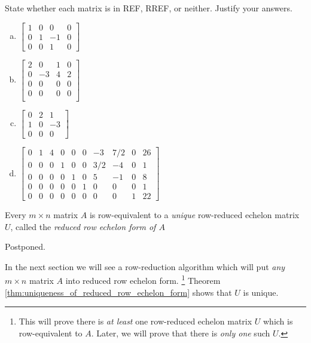 \documentclass[12pt,letterpaper,reqno]{article}
\numberwithin{equation}{section}
\newcommand{\ti}[1]{\textit{#1}}
\newcommand{\fixme}[1]{{\color{orange}{[#1]}}}
\begin{document}
\begin{exercise}
	State whether each matrix is in REF, RREF, or neither. Justify your answers.
	\begin{enumerate}[(a)]
	\item $\begin{bmatrix}
		1&0&0&0 \\
		0&1&-1&0 \\
		0&0&1&0
	\end{bmatrix}$
	\item $\begin{bmatrix}
		2 &0&1&0 \\
		0&-3&4&2 \\
		0&0&0&0 \\
		0&0&0&0 \\
	\end{bmatrix}$
	\item $\begin{bmatrix}
		0&2&1 \\
		1&0&-3 \\
		0&0&0 
	\end{bmatrix}$
	\item $\begin{bmatrix}
		0&1&4&0&0&0&-3&7/2 & 0 & 26 \\
		0&0&0&1&0&0&3/2&-4 & 0 & 1 \\
		0&0&0&0&1&0&5&-1&0&8 \\
		0&0&0&0&0&1&0&0&0&1 \\
		0&0&0&0&0&0&0&0 & 1 & 22
	\end{bmatrix}$
\end{enumerate}
\end{exercise}

\begin{thm}\label{thm:uniqueness_of_reduced_row_echelon_form}
	Every $m \times n$ matrix $A$ is row-equivalent to a \emph{unique} row-reduced echelon matrix $U$, called the \ti{reduced row echelon form of $A$}
\end{thm}

\begin{pf}
Postponed. \fixme{Insert link to proof in later section.}
\end{pf}

In the next section we will see a row-reduction algorithm which will put \ti{any} $m \times n$ matrix $A$ into reduced row echelon form. \footnote{This will prove there is \emph{at least} one row-reduced echelon matrix $U$ which is row-equivalent to $A$. Later, we will prove that there is \emph{only one} such $U$.} Theorem \ref{thm:uniqueness_of_reduced_row_echelon_form} shows that $U$ is unique. \fixme{Explain here why RREF is what we want to arrive at by performing elementary row operations? Columns with no leading 1s are called free variables. These will be parameters, and the leading 1s allow us to solve for the remaining variables in terms of the free ones, giving us the parametric description of the solution set.}
\end{document}

